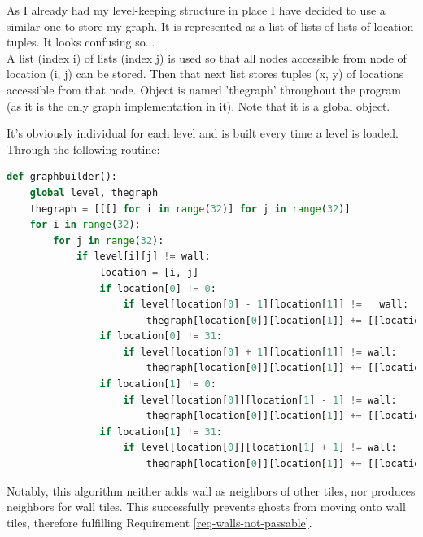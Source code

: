 \documentclass[11pt,a4paper]{report}
\begin{document}
					As I already had my level-keeping structure in place I have decided to use a similar one to store my graph. It is represented as a list of lists of lists of location tuples. It looks confusing so...\\
					A list (index i) of lists (index j) is used so that all nodes accessible from node of location (i, j) can be stored. Then that next list stores tuples (x, y) of locations accessible from that node.
					Object is named 'thegraph' throughout the program (as it is the only graph implementation in it). Note that it is a global object.
					
					It's obviously individual for each level and is built every time a level is loaded. Through the following routine:
					\begin{lstlisting}[language=Python]
def graphbuilder():
	global level, thegraph
	thegraph = [[[] for i in range(32)] for j in range(32)]
	for i in range(32):
		for j in range(32):
			if level[i][j] != wall:
				location = [i, j]
				if location[0] != 0:
					if level[location[0] - 1][location[1]] != 	wall:
						thegraph[location[0]][location[1]] += [[location[0] - 1, location[1]]]
				if location[0] != 31:
					if level[location[0] + 1][location[1]] != wall:
						thegraph[location[0]][location[1]] += [[location[0] + 1, location[1]]]
				if location[1] != 0:
					if level[location[0]][location[1] - 1] != wall:
						thegraph[location[0]][location[1]] += [[location[0], location[1] - 1]]
				if location[1] != 31:
					if level[location[0]][location[1] + 1] != wall:
						thegraph[location[0]][location[1]] += [[location[0], location[1] + 1]]
					\end{lstlisting}
					Notably, this algorithm neither adds wall as neighbors of other tiles, nor produces neighbors for wall tiles. This successfully prevents ghosts from moving onto wall tiles, therefore fulfilling Requirement \ref{req-walls-not-passable}. 
\end{document}
